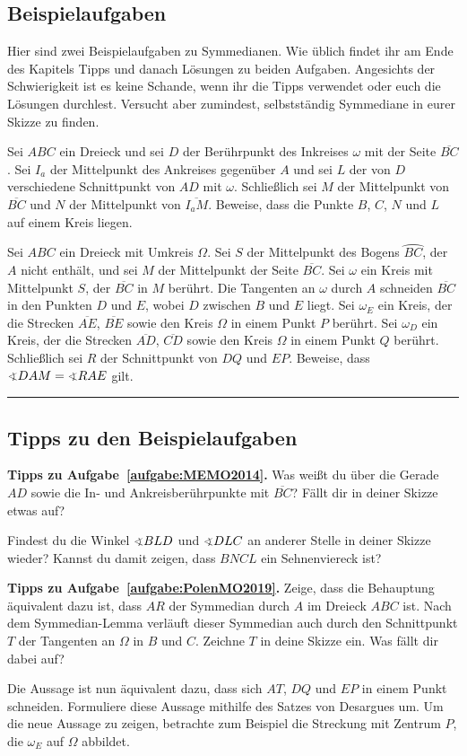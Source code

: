 \subsection*{Beispielaufgaben}
Hier sind zwei Beispielaufgaben zu Symmedianen. Wie üblich findet ihr am Ende des Kapitels Tipps und danach Lösungen zu beiden Aufgaben. Angesichts der Schwierigkeit ist es keine Schande, wenn ihr die Tipps verwendet oder euch die Lösungen durchlest. Versucht aber zumindest, selbstständig Symmediane in eurer Skizze zu finden.
\begin{aufgabe*}[**]\label{aufgabe:MEMO2014}
	Sei $ABC$ ein Dreieck und sei $D$ der Berührpunkt des Inkreises $\omega$ mit der Seite $\overline{BC}$. Sei $I_a$ der Mittelpunkt des Ankreises gegenüber $A$ und sei $L$ der von $D$ verschiedene Schnittpunkt von $AD$ mit $\omega$. Schließlich sei $M$ der Mittelpunkt von $\overline{BC}$ und $N$ der Mittelpunkt von $\overline{I_aM}$. Beweise, dass die Punkte $B$, $C$, $N$ und $L$ auf einem Kreis liegen.
\end{aufgabe*}
\begin{aufgabe*}[***]\label{aufgabe:PolenMO2019}
	Sei $ABC$ ein Dreieck mit Umkreis $\Omega$. Sei $S$ der Mittelpunkt des Bogens $\wideparen{BC}$, der $A$ nicht enthält, und sei $M$ der Mittelpunkt der Seite $\overline{BC}$. Sei $\omega$ ein Kreis mit Mittelpunkt $S$, der $\overline{BC}$ in $M$ berührt. Die Tangenten an $\omega$ durch $A$ schneiden $\overline{BC}$ in den Punkten $D$ und $E$, wobei $D$ zwischen $B$ und $E$ liegt. Sei $\omega_E$ ein Kreis, der die Strecken $\overline{AE}$, $\overline{BE}$ sowie den Kreis $\Omega$ in einem Punkt $P$ berührt. Sei $\omega_D$ ein Kreis, der die Strecken $\overline{AD}$, $\overline{CD}$ sowie den Kreis $\Omega$ in einem Punkt $Q$ berührt. Schließlich sei $R$ der Schnittpunkt von $DQ$ und $EP$. Beweise, dass $\winkel DAM=\winkel RAE$ gilt.
\end{aufgabe*}

\vfill\hrule\vspace{-1em}

\subsection*{Tipps zu den Beispielaufgaben}
\textbf{Tipps zu Aufgabe~\ref{aufgabe:MEMO2014}.} Was weißt du über die Gerade $AD$ sowie die In- und Ankreisberührpunkte mit $\overline{BC}$? Fällt dir in deiner Skizze etwas auf?

Findest du die Winkel $\winkel BLD$ und $\winkel DLC$ an anderer Stelle in deiner Skizze wieder? Kannst du damit zeigen, dass $BNCL$ ein Sehnenviereck ist?

\textbf{Tipps zu Aufgabe~\ref{aufgabe:PolenMO2019}.} Zeige, dass die Behauptung äquivalent dazu ist, dass $AR$ der Symmedian durch $A$ im Dreieck $ABC$ ist. Nach dem Symmedian-Lemma verläuft dieser Symmedian auch durch den Schnittpunkt $T$ der Tangenten an $\Omega$ in $B$ und $C$. Zeichne $T$ in deine Skizze ein. Was fällt dir dabei auf?

Die Aussage ist nun äquivalent dazu, dass sich $AT$, $DQ$ und $EP$ in einem Punkt schneiden. Formuliere diese Aussage mithilfe des Satzes von Desargues um. Um die neue Aussage zu zeigen, betrachte zum Beispiel die Streckung mit Zentrum $P$, die $\omega_E$ auf $\Omega$ abbildet.